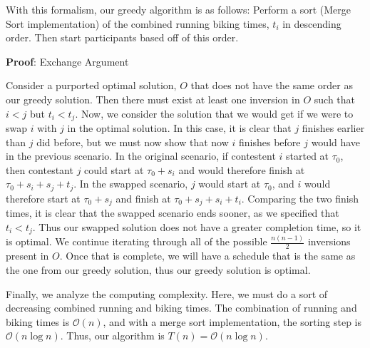 \documentclass[11pt,letterpaper]{article}
\begin{document}
With this formalism, our greedy algorithm is as follows: Perform a sort (Merge Sort implementation) of the combined running biking times, $t_i$ in descending order. Then start participants based off of this order.

\textbf{Proof}: Exchange Argument

Consider a purported optimal solution, $O$ that does not have the same order as our greedy solution. Then there must exist at least one inversion in $O$ such that $i < j$ but $t_i < t_j$. Now, we consider the solution that we would get if we were to swap $i$ with $j$ in the optimal solution. In this case, it is clear that $j$ finishes earlier than $j$ did before, but we must now show that now $i$ finishes before $j$ would have in the previous scenario. In the original scenario, if contestent $i$ started at $\tau_0$, then contestant $j$ could start at $\tau_0 + s_i$ and would therefore finish at $\tau_0 + s_i + s_j + t_j$. In the swapped scenario, $j$ would start at $\tau_0$, and $i$ would therefore start at $\tau_0 + s_j$ and finish at $\tau_0 + s_j + s_i + t_i$. Comparing the two finish times, it is clear that the swapped scenario ends sooner, as we specified that $t_i < t_j$. Thus our swapped solution does not have a greater completion time, so it is optimal. We continue iterating through all of the possible $\frac{n(n-1)}{2}$ inversions present in $O$. Once that is complete, we will have a schedule that is the same as the one from our greedy solution, thus our greedy solution is optimal. 

Finally, we analyze the computing complexity. Here, we must do a sort of decreasing combined running and biking times. The combination of running and biking times is $\mathcal{O}(n)$, and with a merge sort implementation, the sorting step is $\mathcal{O}(n \log n)$. Thus, our algorithm is $T(n) = \mathcal{O}(n \log n)$. 
\end{document}
